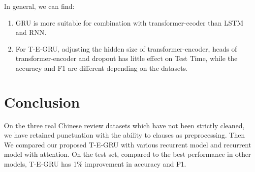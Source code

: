
In general, we can find:
\begin{enumerate}
    \item GRU is more suitable for combination with transformer-ecoder than LSTM and RNN.
    \item For T-E-GRU, adjusting the hidden size of transformer-encoder, heads of transformer-encoder and dropout has little effect on Test Time, while the accuracy and F1 are different depending on the datasets.
\end{enumerate}

\section{Conclusion}
On the three real Chinese review datasets which have not been strictly cleaned, we have retained punctuation with the ability to clauses as preprocessing. Then We compared our proposed T-E-GRU with various recurrent model and recurrent model with attention. On the test set, compared to the best performance in other models, T-E-GRU has 1\% improvement in accuracy and F1.



%



